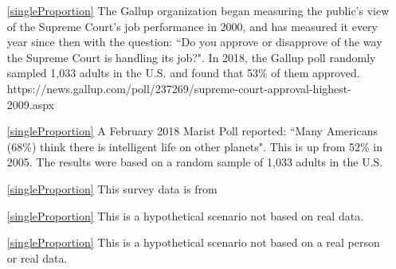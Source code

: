 
\begin{itemize}

\item[\ref{singleProportion}]
    The Gallup organization began measuring the public's view of the Supreme Court's job performance in 2000, and has measured it every year since then with the question: ``Do you approve or disapprove of the way the Supreme Court is handling its job?".  In 2018, the Gallup poll randomly sampled 1,033 adults in the U.S. and found that 53\% of them approved. \\   
        {https://news.gallup.com/poll/237269/supreme-court-approval-highest-2009.aspx}

\item[\ref{singleProportion}]
    A February 2018 Marist Poll reported: ``Many Americans (68\%) think there is intelligent life on other planets".
    This is up from 52\% in 2005.
    The results were based on a random sample of 1,033 adults in the U.S. \\

\item[\ref{singleProportion}]
    This survey data is from\\

\item[\ref{singleProportion}]
    This is a hypothetical scenario not based on real data.

\item[\ref{singleProportion}]
    This is a hypothetical scenario not based on a real person
    or real data.


\end{itemize}
